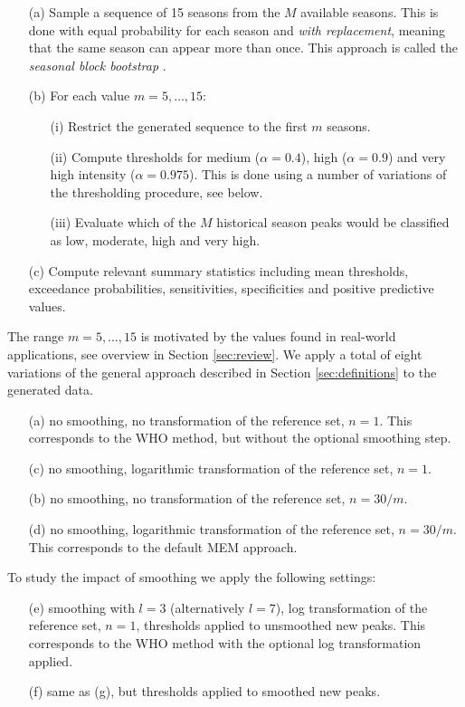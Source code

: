 \documentclass{article}
\begin{document}
\begin{itemize}
\item[(a)] Sample a sequence of 15 seasons from the $M$ available seasons. This is done with equal probability for each season and \textit{with replacement}, meaning that the same season can appear more than once. This approach is called the \textit{seasonal block bootstrap} \citep{Politis2001}.
\item[(b)] For each value $m = 5, \dots, 15$:
\begin{itemize}
\item[(i)] Restrict the generated sequence to the first $m$ seasons.
\item[(ii)] Compute thresholds for medium ($\alpha = 0.4$), high ($\alpha = 0.9$) and very high intensity ($\alpha = 0.975$). This is done using a number of variations of the thresholding procedure, see below.
\item[(iii)] Evaluate which of the $M$ historical season peaks would be classified as low, moderate, high and very high.
\end{itemize}
\item[(c)] Compute relevant summary statistics including mean thresholds, exceedance probabilities, sensitivities, specificities and positive predictive values.
\end{itemize}
The range $m =5, \dots, 15$ is motivated by the values found in real-world applications, see overview in Section \ref{sec:review}. We apply a total of eight variations of the general approach described in Section \ref{sec:definitions} to the generated data.
\begin{enumerate}
\item[(a)] no smoothing, no transformation of the reference set, $n = 1$. This corresponds to the WHO method, but without the optional smoothing step.
\item[(c)] no smoothing, logarithmic transformation of the reference set, $n = 1$.
\item[(b)] no smoothing, no transformation of the reference set, $n = 30/m$.
\item[(d)] no smoothing, logarithmic transformation of the reference set, $n = 30/m$. This corresponds to the default MEM approach.
\end{enumerate}
\noindent To study the impact of smoothing we apply the following settings:
\begin{enumerate}
\item[(e)] smoothing with $l = 3$ (alternatively $l = 7$), log transformation of the reference set, $n = 1$, thresholds applied to unsmoothed new peaks. This corresponds to the WHO method with the optional log transformation applied.
\item[(f)] same as (g), but thresholds applied to smoothed new peaks.
\end{enumerate}
\end{document}
